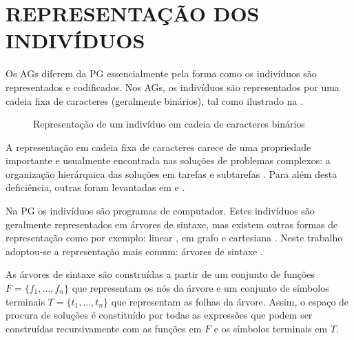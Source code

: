\section{REPRESENTAÇÃO DOS INDIVÍDUOS}
\label{sec:2representacao}

Os \acp{AG} diferem da \ac{PG} essencialmente pela forma como os indivíduos são 
representados e codificados. Nos \acp{AG}, os indivíduos são representados por uma cadeia fixa de caracteres 
(geralmente binários), tal como ilustrado na .

\vspace*{1mm}
\begin{figure}[H]
	\centering
	\makebox[\textwidth]{} \par
	\caption{Representação de um indivíduo em cadeia de caracteres binários}
	\label{Figura221}
\end{figure}
\vspace*{1mm}

A representação em cadeia fixa de caracteres carece de uma propriedade importante e usualmente encontrada nas soluções de 
problemas complexos: a organização hierárquica das soluções em tarefas e subtarefas \citep{Koza1992}. Para além desta deficiência, 
outras foram levantadas em \citep{DeJong1985} e \citep{Koza1992}.

Na \ac{PG} os indivíduos são programas de computador. Estes indivíduos são geralmente representados em árvores de 
sintaxe, mas existem outras formas de representação como por exemplo: linear \citep{Banzhaf1993,Kinnear:Nordin}, 
em grafo \citep{Poli:1996:nnPDGP,Teller:1996:aigp2} e cartesiana \citep{MS:IEEETEC:06,miller:1999:ACGP}. 
Neste trabalho adoptou-se a representação mais comum: árvores de sintaxe \citep{Koza1992}.

As árvores de sintaxe são construídas a partir de um conjunto de funções \\
$F=\{f_1,\ldots,f_n\}$ que representam os nós da árvore
e um conjunto de símbolos terminais $T=\{t_1,\ldots,t_n\}$ que representam as folhas da árvore. 
Assim, o espaço de procura de soluções é constituído por todas as expressões que podem ser construídas recursivamente com as 
funções em $F$ e os símbolos terminais em $T$. 

